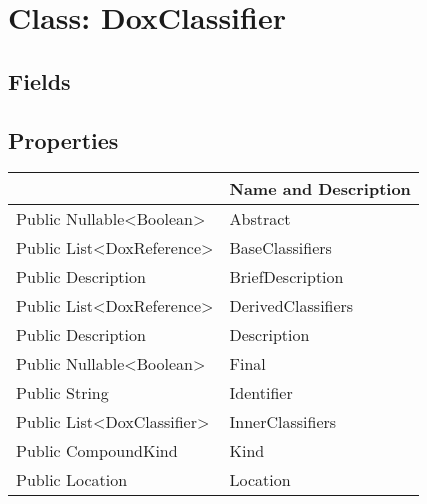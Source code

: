 \documentclass[11pt, oneside, a4paper]{book}
\begin{document}
\hypertarget{SoftwareEngineeringTools.{}Documentation.{}DoxClassifier}{}
\section{Class: DoxClassifier}

\subsection{Fields}

\subsection{Properties}
\begin{center}
\begin{tabular}{| p{3cm} | p{12cm} | }
\hline
\textbf{ } & \textbf{ Name and Description}\\
\hline
 Public  Nullable<Boolean> &  Abstract\hypertarget{SoftwareEngineeringTools.{}Documentation.{}DoxClassifier.{}Abstract}{}\\
\hline
 Public  List<DoxReference> &  BaseClassifiers\hypertarget{SoftwareEngineeringTools.{}Documentation.{}DoxClassifier.{}BaseClassifiers}{}\\
\hline
 Public  Description &  BriefDescription\hypertarget{SoftwareEngineeringTools.{}Documentation.{}DoxClassifier.{}BriefDescription}{}\\
\hline
 Public  List<DoxReference> &  DerivedClassifiers\hypertarget{SoftwareEngineeringTools.{}Documentation.{}DoxClassifier.{}DerivedClassifiers}{}\\
\hline
 Public  Description &  Description\hypertarget{SoftwareEngineeringTools.{}Documentation.{}DoxClassifier.{}Description}{}\\
\hline
 Public  Nullable<Boolean> &  Final\hypertarget{SoftwareEngineeringTools.{}Documentation.{}DoxClassifier.{}Final}{}\\
\hline
 Public  String &  Identifier\hypertarget{SoftwareEngineeringTools.{}Documentation.{}DoxClassifier.{}Identifier}{}\\
\hline
 Public  List<DoxClassifier> &  InnerClassifiers\hypertarget{SoftwareEngineeringTools.{}Documentation.{}DoxClassifier.{}InnerClassifiers}{}\\
\hline
 Public  CompoundKind &  Kind\hypertarget{SoftwareEngineeringTools.{}Documentation.{}DoxClassifier.{}Kind}{}\\
\hline
 Public  Location &  Location\hypertarget{SoftwareEngineeringTools.{}Documentation.{}DoxClassifier.{}Location}{}\\

\end{tabular}
\end{center}
\end{document}
